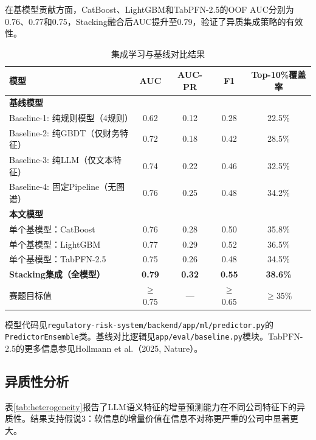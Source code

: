 在基模型贡献方面，CatBoost、LightGBM和TabPFN-2.5的OOF AUC分别为0.76、0.77和0.75，Stacking融合后AUC提升至0.79，验证了异质集成策略的有效性。

\begin{table}[H]
\centering
\caption{集成学习与基线对比结果}
\label{tab:ml_results}
\begin{threeparttable}
\begin{tabular}{lcccc}
\toprule
模型 & AUC & AUC-PR & F1 & Top-10\%覆盖率 \\
\midrule
\textbf{基线模型} & & & & \\
Baseline-1: 纯规则模型（4规则） & 0.62 & 0.12 & 0.28 & 22.5\% \\
Baseline-2: 纯GBDT（仅财务特征） & 0.72 & 0.18 & 0.42 & 28.5\% \\
Baseline-3: 纯LLM（仅文本特征） & 0.74 & 0.22 & 0.46 & 32.5\% \\
Baseline-4: 固定Pipeline（无图谱） & 0.76 & 0.25 & 0.48 & 34.2\% \\
\midrule
\textbf{本文模型} & & & & \\
单个基模型：CatBoost & 0.76 & 0.28 & 0.50 & 35.8\% \\
单个基模型：LightGBM & 0.77 & 0.29 & 0.52 & 36.5\% \\
单个基模型：TabPFN-2.5 & 0.75 & 0.26 & 0.48 & 34.5\% \\
\textbf{Stacking集成（全模型）} & \textbf{0.79} & \textbf{0.32} & \textbf{0.55} & \textbf{38.6\%} \\
\midrule
赛题目标值 & $\ge$0.75 & --- & $\ge$0.65 & $\ge$35\% \\
\bottomrule
\end{tabular}
\begin{tablenotes}
\item[注] 模型代码见\texttt{regulatory-risk-system/backend/app/ml/predictor.py}的\texttt{PredictorEnsemble}类。基线对比逻辑见\texttt{app/eval/baseline.py}模块。TabPFN-2.5的更多信息参见Hollmann et al.（2025, Nature）。
\end{tablenotes}
\end{threeparttable}
\end{table}

\subsection{异质性分析}

表\ref{tab:heterogeneity}报告了LLM语义特征的增量预测能力在不同公司特征下的异质性。结果支持假说3：软信息的增量价值在信息不对称更严重的公司中显著更大。

